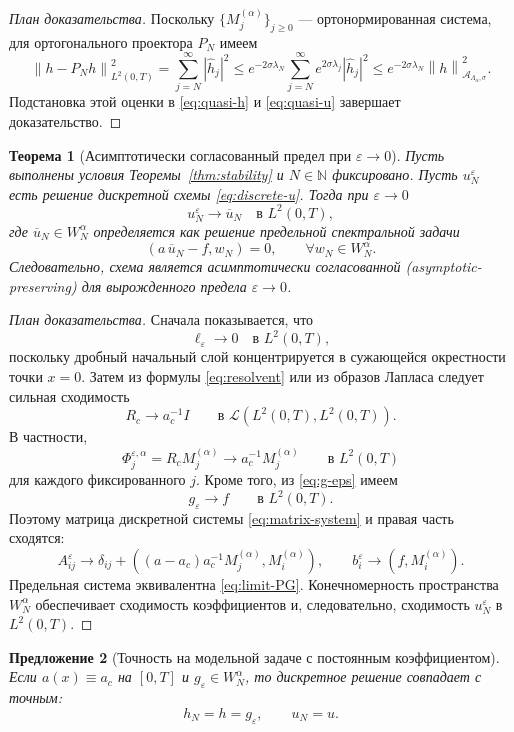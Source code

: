 \documentclass[12pt,a4paper]{article}
\newtheorem{theorem}{Теорема}[section]
\newtheorem{proposition}[theorem]{Предложение}
\theoremstyle{definition}
\newcommand{\eps}{\varepsilon}
\newcommand{\N}{\mathbb{N}}
\newcommand{\Rc}{R_c}
\newcommand{\inner}[2]{\left(#1,#2\right)}
\newcommand{\norm}[1]{\left\lVert #1 \right\rVert}
\begin{document}
\begin{proof}[План доказательства]
Поскольку $\{M_j^{(\alpha)}\}_{j\ge0}$ --- ортонормированная система, для ортогонального проектора $P_N$
имеем
\[
\norm{h-P_Nh}_{L^2(0,T)}^2
=
\sum_{j=N}^\infty |\widehat h_j|^2
\le
e^{-2\sigma \lambda_N}
\sum_{j=N}^\infty e^{2\sigma \lambda_j}|\widehat h_j|^2
\le
e^{-2\sigma \lambda_N}
\norm{h}_{\mathcal{A}_{\Lambda_\alpha,\sigma}}^2.
\]
Подстановка этой оценки в \eqref{eq:quasi-h} и \eqref{eq:quasi-u} завершает доказательство.
\end{proof}

\begin{theorem}[Асимптотически согласованный предел при $\eps\to0$]
\label{thm:AP}
Пусть выполнены условия Теоремы~\ref{thm:stability} и $N\in\N$ фиксировано.
Пусть $u_N^\eps$ есть решение дискретной схемы \eqref{eq:discrete-u}. Тогда при $\eps\to0$
\[
u_N^\eps \to \overline u_N \quad \text{в } L^2(0,T),
\]
где $\overline u_N\in W_N^\alpha$ определяется как решение предельной спектральной задачи
\begin{equation}
\label{eq:limit-PG}
\inner{a\,\overline u_N - f}{w_N}=0,
\qquad \forall w_N\in W_N^\alpha.
\end{equation}
Следовательно, схема является асимптотически согласованной
(\emph{asymptotic-preserving}) для вырожденного предела $\eps\to0$.
\end{theorem}

\begin{proof}[План доказательства]
Сначала показывается, что
\[
\ell_\eps \to 0 \quad \text{в } L^2(0,T),
\]
поскольку дробный начальный слой концентрируется в сужающейся окрестности точки $x=0$.
Затем из формулы \eqref{eq:resolvent} или из образов Лапласа следует сильная сходимость
\[
\Rc \to a_c^{-1}I \qquad \text{в } \mathcal{L}(L^2(0,T),L^2(0,T)).
\]
В частности,
\[
\Phi_j^{\eps,\alpha}=\Rc M_j^{(\alpha)} \to a_c^{-1}M_j^{(\alpha)}
\qquad \text{в } L^2(0,T)
\]
для каждого фиксированного $j$.
Кроме того, из \eqref{eq:g-eps} имеем
\[
g_\eps \to f \qquad \text{в } L^2(0,T).
\]
Поэтому матрица дискретной системы \eqref{eq:matrix-system} и правая часть сходятся:
\[
A^\eps_{ij}\to \delta_{ij}+\inner{(a-a_c)a_c^{-1}M_j^{(\alpha)}}{M_i^{(\alpha)}},
\qquad
b_i^\eps\to \inner{f}{M_i^{(\alpha)}}.
\]
Предельная система эквивалентна \eqref{eq:limit-PG}. Конечномерность пространства $W_N^\alpha$
обеспечивает сходимость коэффициентов и, следовательно, сходимость $u_N^\eps$ в $L^2(0,T)$.
\end{proof}

\begin{proposition}[Точность на модельной задаче с постоянным коэффициентом]
\label{prop:exact-constant}
Если $a(x)\equiv a_c$ на $[0,T]$ и $g_\eps\in W_N^\alpha$, то дискретное решение совпадает
с точным:
\[
h_N=h=g_\eps,
\qquad
u_N=u.
\]
\end{proposition}
\end{document}
